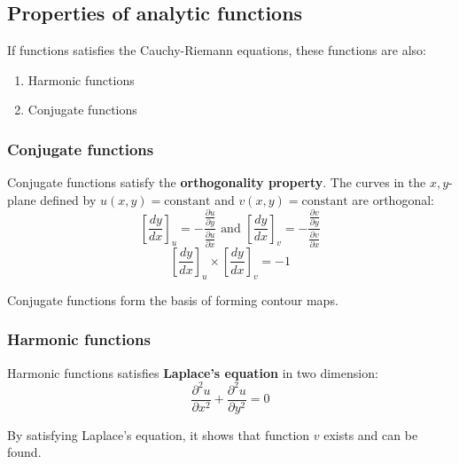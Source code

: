 \documentclass[10pt,a4paper]{article}
\begin{document}
\subsection{Properties of analytic functions}

If functions satisfies the Cauchy-Riemann equations, these functions are also:
\begin{enumerate}
    \item Harmonic functions
    \item Conjugate functions
\end{enumerate}

\subsubsection{Conjugate functions}

Conjugate functions satisfy the \textbf{orthogonality property}. The curves in the $x,y$-plane
defined by $u(x,y)=\text{constant}$ and $v(x,y)=\text{constant}$ are orthogonal: 
\begin{equation*}
    \left[\frac{dy}{dx}\right]_u = -\frac{\frac{\partial u}{\partial y}}{\frac{\partial u}{\partial x}} \text{   and   } 
    \left[\frac{dy}{dx}\right]_v = -\frac{\frac{\partial v}{\partial y}}{\frac{\partial v}{\partial x}}
\end{equation*}
\begin{equation*}
    \left[\frac{dy}{dx}\right]_u \times \left[\frac{dy}{dx}\right]_v = -1
\end{equation*}

Conjugate functions form the basis of forming contour maps.

\subsubsection{Harmonic functions}

\begin{tcolorbox}[breakable,colback=white]
    Harmonic functions satisfies \textbf{Laplace's equation} in two dimension:
    \begin{equation*}
        \frac{\partial^2u}{\partial x^2} + \frac{\partial^2u}{\partial y^2}=0
    \end{equation*}

    By satisfying Laplace's equation, it shows that function $v$ exists and can be found.
\end{tcolorbox}
\end{document}
